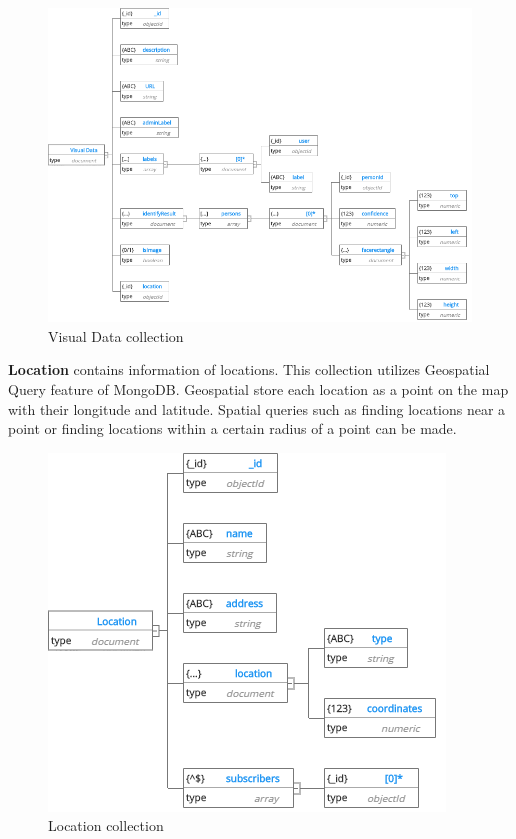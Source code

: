 \begin{center}
	\begin{figure}[H]
		\centering
		\includegraphics[width=1\columnwidth]{images/chap4/Visual.png}
		\caption{Visual Data collection}
	\end{figure}
\end{center}
\cleardoublepage

\textbf{Location} contains information of locations. This collection utilizes Geospatial Query feature of MongoDB. Geospatial store each location as a point on the map with their longitude and latitude. Spatial queries such as finding locations near a point or finding locations within a certain radius of a point can be made.
\begin{center}
	\begin{figure}[H]
		\centering
		\includegraphics[width=1\columnwidth]{images/chap4/Location.png}
		\caption{Location collection}
	\end{figure}
\end{center}
\cleardoublepage

